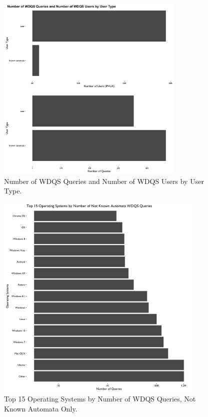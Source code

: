 \documentclass[12pt,]{article}
\begin{document}
\begin{figure}[H]
\centering
\includegraphics[width=9cm,height=9cm,keepaspectratio]{figures/by_agent_type.png}
\caption{Number of WDQS Queries and Number of WDQS Users by User Type.}
\end{figure}

\begin{figure}[H]
\centering
\includegraphics[width=10cm,height=10cm,keepaspectratio]{figures/n_query_by_os.png}
\caption{Top 15 Operating Systems by Number of WDQS Queries, Not Known
Automata Only.}
\end{figure}
\end{document}
